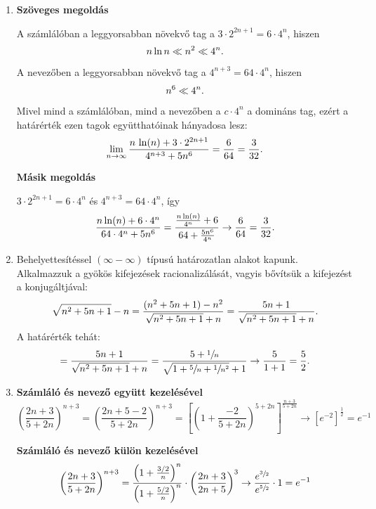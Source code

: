 \documentclass[11pt]{scrartcl}
\begin{document}
\begin{enumerate}
	\item \textbf{Szöveges megoldás}

	      A számlálóban a leggyorsabban növekvő tag a $3 \cdot 2^{2n + 1}
		      = 6 \cdot 4^n$, hiszen
	      \[
		      n \ln n \ll n^2 \ll 4^n
		      \text.
	      \]
	      A nevezőben a leggyorsabban növekvő tag a $4^{n + 3} = 64 \cdot 4^n$,
	      hiszen
	      \[
		      n^6 \ll 4^n
		      \text.
	      \]
	      Mivel mind a számlálóban, mind a nevezőben a $c \cdot 4^n$ a domináns
	      tag, ezért a határérték ezen tagok együtthatóinak hányadosa lesz:
	      \[
		      \lim_{n \to \infty} \frac{
			      n \, \ln(n) + 3 \cdot 2^{2n + 1}
		      }{
			      4^{n + 3} + 5 n^6
		      } = \frac{6}{64} = \frac{3}{32}
		      \text.
	      \]

	      \textbf{Másik megoldás}

	      $3 \cdot 2^{2n + 1} = 6 \cdot 4^n$ és $4^{n + 3} = 64 \cdot 4^n$, így
	      \[
		      \frac{n \ln(n) + 6 \cdot 4^n}{64 \cdot 4^n + 5n^6}
		      = \frac{\frac{n \ln(n)}{4^n} + 6}{64 + \frac{5n^6}{4^n}}
		      \to \frac{6}{64}
		      = \frac{3}{32}
		      \text.
	      \]

	\item Behelyettesítéssel $(\infty - \infty)$ típusú határozatlan alakot
	      kapunk. Alkalmazzuk a gyökös kifejezések racionalizálását, vagyis
	      bővítsük a kifejezést a konjugáltjával:
	      \[
		      \sqrt{n^2 + 5n + 1} - n
		      = \frac{
			      (n^2 + 5n + 1) - n^2
		      }{
			      \sqrt{n^2 + 5n + 1} + n
		      }
		      = \frac{5n + 1}{\sqrt{n^2 + 5n + 1} + n}
		      \text.
	      \]
	      A határérték tehát:
	      \[
		      = \frac{5n + 1}{\sqrt{n^2 + 5n + 1} + n}
		      = \frac{5 + \sfrac{1}{n}}{\sqrt{1 + \sfrac{5}{n} + \sfrac{1}{n^2}} + 1}
		      \to \frac{5}{1 + 1} = \frac{5}{2}
		      \text.
	      \]

	\item \textbf{Számláló és nevező együtt kezelésével}
	      \[
		      \left( \frac{2n + 3}{5 + 2n} \right)^{n + 3}
		      = \left( \frac{2n + 5 - 2}{5 + 2n} \right)^{n + 3}
		      = \left[
			      \left( 1 + \frac{-2}{5 + 2n} \right)^{5 + 2n}
			      \right]^{\frac{n + 3}{5 + 2n}}
		      \to \left[e^{-2}\right]^{\frac{1}{2}} = e^{-1}
	      \]

	      \textbf{Számláló és nevező külön kezelésével}
	      \[
		      \left( \frac{2n + 3}{5 + 2n} \right)^{n + 3}
		      = \frac{\left(1 + \frac{3/2}{n}\right)^n}{\left(1 + \frac{5/2}{n}\right)^n}
		      \cdot \left( \frac{2n + 3}{2n + 5} \right)^3
		      \to \frac{e^{\sfrac{3}{2}}}{e^{\sfrac{5}{2}}} \cdot 1
		      = e^{-1}
	      \]
\end{enumerate}
\end{document}
